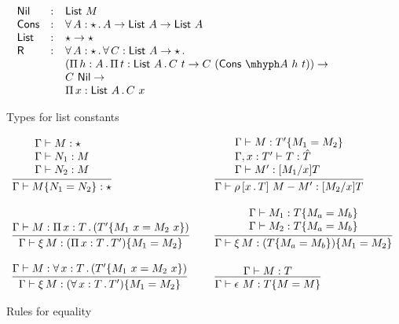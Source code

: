 \documentclass{article}
\begin{document}
\begin{figure}
  \[
  \begin{array}{lll}
  \mathsf{Nil} & : & \mathsf{List}\ M
\\
\mathsf{Cons} & : & \allt{A}{\star}{A \to \mathsf{List}\ A \to \mathsf{List}\ A}
 \\
 \mathsf{List} & : & \star \to \star
 \\
 \mathsf{R} & : & \allt{A}{\star}{\allt{C}{\mathsf{List}\ A \to \star}{\ }} \\
   \ &\ &
   (\Pia{h}{A}{\Pia{t}{\mathsf{List}\ A}{C\ t \to C\ (\appe{\mathsf{Cons}}{A}\ h\ t)}}) \to \\
   \ &\ &  C\ \mathsf{Nil} \to \\
   \ &\ & \Pia{x}{\mathsf{List}\ A}{C\ x}
  \end{array}
  \]
\caption{Types for list constants}
\label{fig:sartplist}
  \end{figure}

\begin{figure}
  \[
  \begin{array}{lll}
  \infer{\Gamma \vdash \eqtm{N_1}{M}{N_2} : \star}{\begin{array}{l}\Gamma \vdash M : \star \\ \Gamma \vdash N_1 : M \\ \Gamma \vdash N_2 : M\end{array}}
  &\ &
  \infer{\Gamma \vdash \cng{x}{T}{M}{M'} : [M_2/x]T}
        {\begin{array}{l}\Gamma \vdash M : \eqtm{M_1}{T'}{M_2} \\ \Gamma , x : T' \vdash T : \hat{T} \\ \Gamma \vdash M' : [M_1/x]T
        \end{array}}
  \\ \\
     \infer{\Gamma \vdash \ext{M} : \eqtm{M_1}{(\Pia{x}{T}{T'})}{M_2}}{\Gamma \vdash M : \Pia{x}{T}{(\eqtm{M_1\ x}{T'}{M_2\ x})}}
    &\ &
          \infer{\Gamma \vdash \ext{M} : \eqtm{M_1}{(\eqtm{M_a}{T}{M_b})}{M_2}}
                {\begin{array}{l}\Gamma \vdash M_1 :\eqtm{M_a}{T}{M_b} \\ \Gamma \vdash M_2 : \eqtm{M_a}{T}{M_b} \end{array}}
\\ \\ 
     \infer{\Gamma \vdash \ext{M} : \eqtm{M_1}{(\allt{x}{T}{T'})}{M_2}}{\Gamma \vdash M : \allt{x}{T}{(\eqtm{M_1\ x}{T'}{M_2\ x})}}
    &\ & 
    \infer{\Gamma \vdash \rfl{M} : \eqtm{M}{T}{M}}{\Gamma \vdash M : T}

\end{array}
  \]
  \caption{Rules for equality}
  \label{fig:sartpeq}
  \end{figure}
\end{document}
